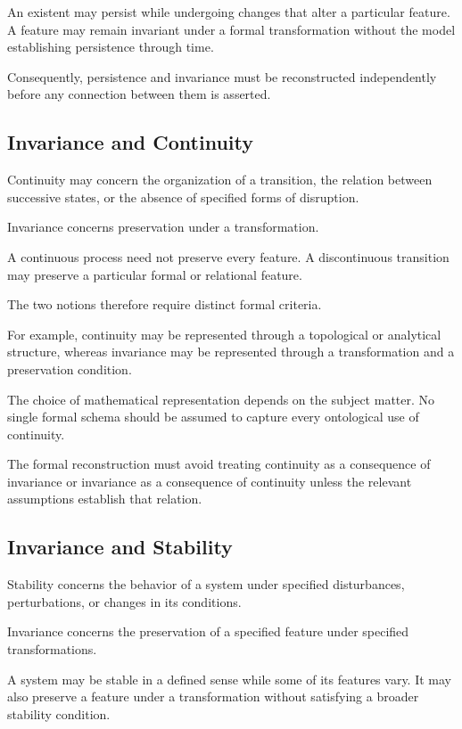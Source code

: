 An existent may persist while undergoing changes
that alter a particular feature. A feature may
remain invariant under a formal transformation
without the model establishing persistence
through time.

Consequently, persistence and invariance must
be reconstructed independently before any
connection between them is asserted.

\subsection{Invariance and Continuity}

Continuity may concern the organization of a
transition, the relation between successive
states, or the absence of specified forms of
disruption.

Invariance concerns preservation under a
transformation.

A continuous process need not preserve every
feature. A discontinuous transition may preserve
a particular formal or relational feature.

The two notions therefore require distinct
formal criteria.

For example, continuity may be represented
through a topological or analytical structure,
whereas invariance may be represented through
a transformation and a preservation condition.

The choice of mathematical representation
depends on the subject matter. No single formal
schema should be assumed to capture every
ontological use of continuity.

The formal reconstruction must avoid treating
continuity as a consequence of invariance or
invariance as a consequence of continuity
unless the relevant assumptions establish
that relation.

\subsection{Invariance and Stability}

Stability concerns the behavior of a system
under specified disturbances, perturbations,
or changes in its conditions.

Invariance concerns the preservation of a
specified feature under specified transformations.

A system may be stable in a defined sense while
some of its features vary. It may also preserve
a feature under a transformation without
satisfying a broader stability condition.


